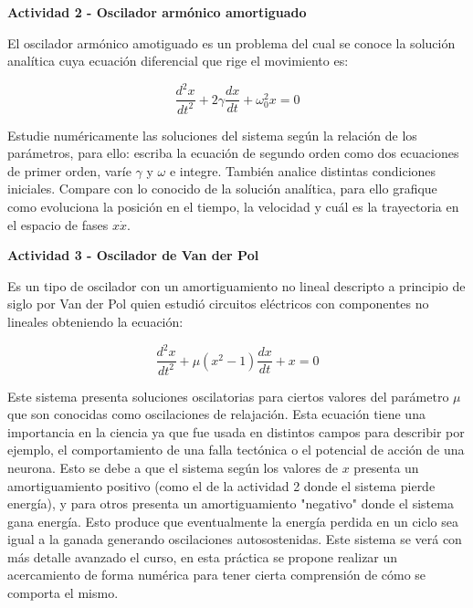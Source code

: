 \documentclass[a4paper,12pt]{article}
\begin{document}
{\Large \textbf{Actividad 2 - Oscilador arm\'onico amortiguado}}

El oscilador arm\'onico amotiguado es un problema del cual se conoce la soluci\'on anal\'itica cuya ecuaci\'on diferencial que rige el movimiento es:

\begin{equation}
	\frac{d^2 x}{dt^2} + 2\gamma\frac{dx}{dt} + \omega_0^2x = 0
\end{equation}

Estudie num\'ericamente las soluciones del sistema seg\'un la relaci\'on de los par\'ametros, para ello: escriba la ecuaci\'on de segundo orden como dos ecuaciones de primer orden, var\'ie $\gamma$ y $\omega$ e integre. Tambi\'en analice distintas condiciones iniciales. Compare con lo conocido de la soluci\'on anal\'itica, para ello grafique como evoluciona la posici\'on en el tiempo, la velocidad y cu\'al es la trayectoria en el espacio de fases $x  \dot{x}$.\newline


{\Large \textbf{Actividad 3 - Oscilador de Van der Pol}}

Es un tipo de oscilador con un amortiguamiento no lineal descripto a principio de siglo por Van der Pol quien estudi\'o circuitos el\'ectricos con componentes no lineales obteniendo la ecuaci\'on:

\begin{equation}
	\frac{d^2 x}{dt^2} + \mu(x^2-1)\frac{dx}{dt} + x = 0
\end{equation}

Este sistema presenta soluciones oscilatorias para ciertos valores del par\'ametro $\mu$ que son conocidas como oscilaciones de relajaci\'on. Esta ecuaci\'on tiene una importancia en la ciencia ya que fue usada en distintos campos para describir por ejemplo, el comportamiento de una falla tect\'onica o el potencial de acci\'on de una neurona. Esto se debe a que el sistema seg\'un los valores de $x$ presenta un amortiguamiento positivo (como el de la actividad 2 donde el sistema pierde energ\'ia), y para otros presenta un amortiguamiento "negativo" donde el sistema gana energ\'ia. Esto produce que eventualmente la energ\'ia perdida en un ciclo sea igual a la ganada generando oscilaciones autosostenidas. Este sistema se ver\'a con m\'as detalle avanzado el curso, en esta pr\'actica se propone realizar un acercamiento de forma num\'erica para tener cierta comprensi\'on de c\'omo se comporta el mismo.
\end{document}
